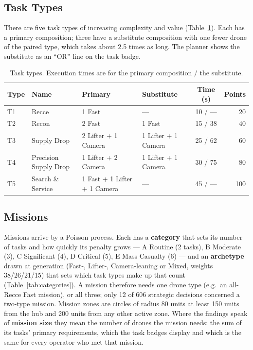 \documentclass[10pt]{article}
\theoremstyle{definition}
\begin{document}
\subsection{Task Types}\label{sec:tasks}

There are five task types of increasing complexity and value (Table~\ref{tab:tasks}). Each has a primary composition;
three have a substitute composition with one fewer drone of the paired type, which takes about 2.5 times as long.
The planner shows the substitute as an ``OR'' line on the task badge.

\begin{table}[htbp]
\centering
\caption{Task types. Execution times are for the primary composition / the substitute.}
\label{tab:tasks}
\small
\begin{tabular}{llllcr}
\toprule
\textbf{Type} & \textbf{Name} & \textbf{Primary} & \textbf{Substitute} & \textbf{Time (s)} & \textbf{Points} \\
\midrule
T1 & Recce                   & 1 Fast                       & ---                 & 10 / ---  & 20  \\
T2 & Recon                   & 2 Fast                       & 1 Fast              & 15 / 38   & 40  \\
T3 & Supply Drop             & 2 Lifter + 1 Camera          & 1 Lifter + 1 Camera & 25 / 62   & 60  \\
T4 & Precision Supply Drop   & 1 Lifter + 2 Camera          & 1 Lifter + 1 Camera & 30 / 75   & 80  \\
T5 & Search \& Service       & 1 Fast + 1 Lifter + 1 Camera & ---                 & 45 / ---  & 100 \\
\bottomrule
\end{tabular}
\end{table}

\subsection{Missions}\label{sec:missions}

Missions arrive by a Poisson process. Each has a \textbf{category} that sets its number of tasks and how quickly its
penalty grows --- A Routine (2 tasks), B Moderate (3), C Significant (4), D Critical (5), E Mass Casualty (6) --- and
an \textbf{archetype} drawn at generation (Fast-, Lifter-, Camera-leaning or Mixed, weights 38/26/21/15) that sets
which task types make up that count (Table~\ref{tab:categories}). A mission therefore needs one drone type (e.g.\ an
all-Recce Fast mission), or all three; only 12 of 606 strategic decisions concerned a two-type mission. Mission zones
are circles of radius 80 units at least 150 units from the hub and 200 units from any other active zone. Where the
findings speak of \textbf{mission size} they mean the number of drones the mission needs: the sum of its tasks'
primary requirements, which the task badges display and which is the same for every operator who met that mission.
\end{document}
